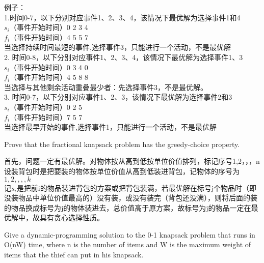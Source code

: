 \documentclass[a4paper, justified]{tufte-handout}
\begin{document}
\begin{solution}
例子：\\
1.时间0-7，以下分别对应事件1、2、3、4，该情况下最优解为选择事件1和4\\
$s_i$（事件开始时间）0 2 3 4\\
$f_i$（事件开始时间）4 5 5 7\\
当选择持续时间最短的事件,选择事件3，只能进行一个活动，不是最优解\\
2. 时间0-8，以下分别对应事件1、2、3、4，该情况下最优解为选择事件1、3\\
$s_i$（事件开始时间）0 3 4 0\\
$f_i$（事件开始时间）4 5 8 8\\
当选择与其他剩余活动重叠最少者：先选择事件3，不是最优解。\\
3. 时间0-7，以下分别对应事件1、2、3，该情况下最优解为选择事件2和3\\
$s_i$（事件开始时间）0 2 5\\
$f_i$（事件开始时间）7 5 7\\
当选择最早开始的事件,选择事件1，只能进行一个活动，不是最优解\\
\end{solution}

\begin{problem}[TC 16.2-1]
Prove that the fractional knapsack problem has the greedy-choice property.
\end{problem}

\begin{solution}
首先，问题一定有最优解。对物体按从高到低按单位价值排列，标记序号1,2，，，n\\
设装背包时是把要装的物体按单位价值从高到低装进背包，记物体的序号为$1,2,,,,k$\\
记$s_i$是把前i的物品装进背包的方案或把背包装满，若最优解在标号j个物品时（即没装物品中单位价值最高的）没有装，或没有装完（背包还没满），则将后面的装的物品换成标号为j的物体装进去，总价值高于原方案，故标号为j的物品一定在最优解中，故具有贪心选择性质。

\end{solution}

\begin{problem}[TC 16.2-2]
Give a dynamic-programming solution to the 0-1 knapsack problem that runs in O(nW) time, where n is the number of items and W is the maximum weight of
items that the thief can put in his knapsack.

\end{problem}
\end{document}
